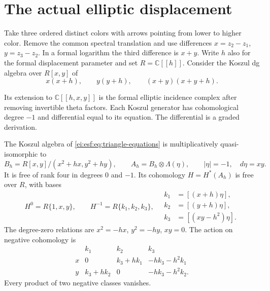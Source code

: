 \section{The actual elliptic displacement}
\label{ei:sec:displacement}

Take three ordered distinct colors with arrows pointing
from lower to higher color. Remove the common spectral
translation and use differences $x=z_2-z_1$, $y=z_3-z_2$.
In a formal logarithm the third difference is $x+y$.
Write $h$ also for the formal displacement parameter and set
$R=\mathbb C[[h]]$. Consider the Koszul dg algebra over $R[x,y]$ of
\begin{equation}\label{ei:esf:eq:triangle-equations}
 x(x+h),\qquad y(y+h),\qquad(x+y)(x+y+h).
\end{equation}

Its extension to $\mathbb C[[h,x,y]]$ is the formal elliptic
incidence complex after removing invertible theta factors.
Each Koszul generator has cohomological degree $-1$ and
differential equal to its equation. The differential is a
graded derivation.

\begin{theorem}\label{ei:esf:thm:flat-triangle}
The Koszul algebra of \eqref{ei:esf:eq:triangle-equations} is
multiplicatively quasi-isomorphic to
\begin{equation}\label{ei:esf:eq:triangle}
 B_h=R[x,y]/(x^2+hx,y^2+hy),\qquad
 A_h=B_h\otimes\Lambda(\eta),\qquad
 |\eta|=-1,\quad d\eta=xy.
\end{equation}
It is free of rank four in degrees $0$ and $-1$.
Its cohomology $H=H^*(A_h)$ is free over $R$, with bases
\begin{equation}\label{ei:esf:eq:cohomology}
 H^0=R\{1,x,y\},\qquad
 H^{-1}=R\{k_1,k_2,k_3\},
 \quad
 \begin{aligned}
 k_1&=[(x+h)\eta],\\
 k_2&=[(y+h)\eta],\\
 k_3&=[(xy-h^2)\eta].
 \end{aligned}
\end{equation}
The degree-zero relations are $x^2=-hx$, $y^2=-hy$, $xy=0$.
The action on negative cohomology is
\begin{equation}\label{ei:esf:eq:action}
\begin{array}{c|ccc}
 &k_1&k_2&k_3\\\hline
 x&0&k_3+hk_1&-hk_3-h^2k_1\\
 y&k_3+hk_2&0&-hk_3-h^2k_2.
\end{array}
\end{equation}
Every product of two negative classes vanishes.
\end{theorem}


